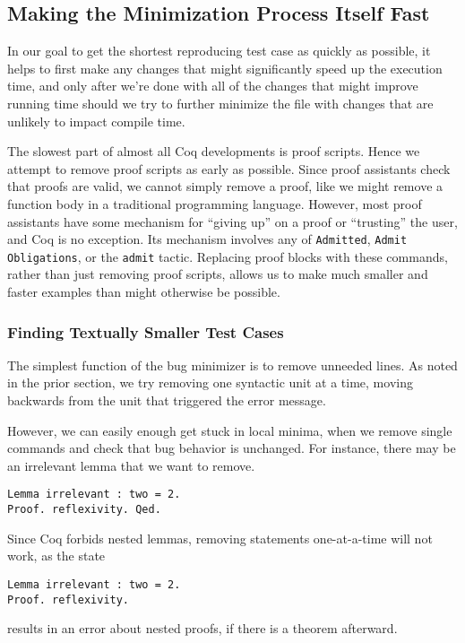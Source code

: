 \documentclass[a4paper,USenglish,cleveref,autoref,thm-restate]{lipics-v2021}
\begin{document}
\subsection{Making the Minimization Process Itself Fast}

In our goal to get the shortest reproducing test case as quickly as possible, it helps to first make any changes that might significantly speed up the execution time, and only after we're done with all of the changes that might improve running time should we try to further minimize the file with changes that are unlikely to impact compile time.

The slowest part of almost all Coq developments is proof scripts.
Hence we attempt to remove proof scripts as early as possible.
Since proof assistants check that proofs are valid, we cannot simply remove a proof, like we might remove a function body in a traditional programming language.
However, most proof assistants have some mechanism for ``giving up'' on a proof or ``trusting'' the user, and Coq is no exception.
Its mechanism involves any of \verb|Admitted|, \verb|Admit Obligations|, or the \verb|admit| tactic.
Replacing proof blocks with these commands, rather than just removing proof scripts, allows us to make much smaller and faster examples than might otherwise be possible.

\subsubsection{Finding Textually Smaller Test Cases}

The simplest function of the bug minimizer is to remove unneeded lines.
As noted in the prior section, we try removing one syntactic unit at a time, moving backwards from the unit that triggered the error message.

However, we can easily enough get stuck in local minima, when we remove single commands and check that bug behavior is unchanged.
For instance, there may be an irrelevant lemma that we want to remove.
\begin{verbatim}
Lemma irrelevant : two = 2.
Proof. reflexivity. Qed.
\end{verbatim}
Since Coq forbids nested lemmas, removing statements one-at-a-time will not work, as the state
\begin{verbatim}
Lemma irrelevant : two = 2.
Proof. reflexivity.
\end{verbatim}
results in an error about nested proofs, if there is a theorem afterward.
\end{document}
